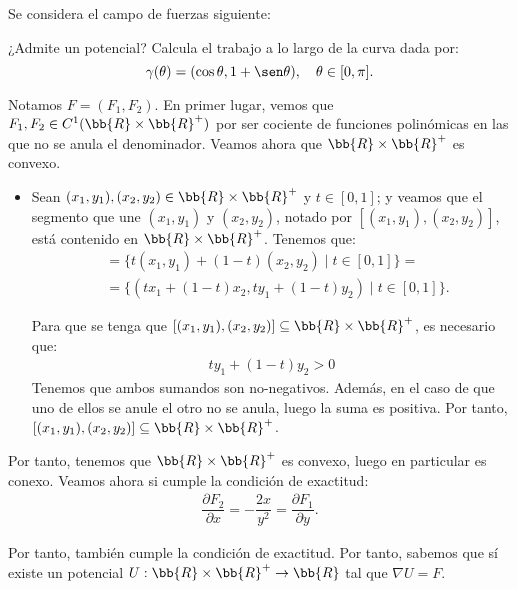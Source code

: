 \documentclass[12pt]{article}
\begin{document}
    \begin{ejercicio}
        Se considera el campo de fuerzas siguiente:

        ¿Admite un potencial? Calcula el trabajo a lo largo de la curva dada por:
        \begin{equation*}
            \gamma(\theta) = (\cos \theta, 1 + \sen \theta), \quad \theta \in [0,\pi].
        \end{equation*}

        Notamos $F=(F_1,F_2)$. En primer lugar, vemos que $F_1,F_2\in C^1(\bb{R}\times \bb{R}^+)$ por ser cociente de funciones polinómicas en las que no se anula el denominador. Veamos ahora que $\bb{R}\times \bb{R}^+$ es convexo.
        \begin{itemize}
            \item Sean $(x_1,y_1),(x_2,y_2)\in \bb{R}\times \bb{R}^+$ y $t \in [0,1]$; y veamos que el segmento que une $(x_1,y_1)$ y $(x_2,y_2)$, notado por $[(x_1,y_1),(x_2,y_2)]$, está contenido en $\bb{R}\times \bb{R}^+$. Tenemos que:
            \begin{align*}
                [(x_1,y_1),(x_2,y_2)]
                &= \{t(x_1,y_1) + (1-t)(x_2,y_2) \mid t \in [0,1]\}
                =\\&= \{(tx_1 + (1-t)x_2,ty_1 + (1-t)y_2) \mid t \in [0,1]\}.
            \end{align*}

            Para que se tenga que $[(x_1,y_1),(x_2,y_2)]\subseteq \bb{R}\times \bb{R}^+$, es necesario que:
            \begin{align*}
                ty_1 + (1-t)y_2 > 0
            \end{align*}
            Tenemos que ambos sumandos son no-negativos. Además, en el caso de que uno de ellos se anule el otro no se anula, luego la suma es positiva. Por tanto, $[(x_1,y_1),(x_2,y_2)]\subseteq \bb{R}\times \bb{R}^+$.
        \end{itemize}

        Por tanto, tenemos que $\bb{R}\times \bb{R}^+$ es convexo, luego en particular es conexo. Veamos ahora si cumple la condición de exactitud:
        \begin{align*}
            \dfrac{\partial F_2}{\partial x} = -\dfrac{2x}{y^2} = \dfrac{\partial F_1}{\partial y}.
        \end{align*}

        Por tanto, también cumple la condición de exactitud. Por tanto, sabemos que sí existe un potencial $U:\bb{R}\times \bb{R}^+\to \bb{R}$ tal que $\nabla U = F$.\\


\end{ejercicio}
\end{document}
